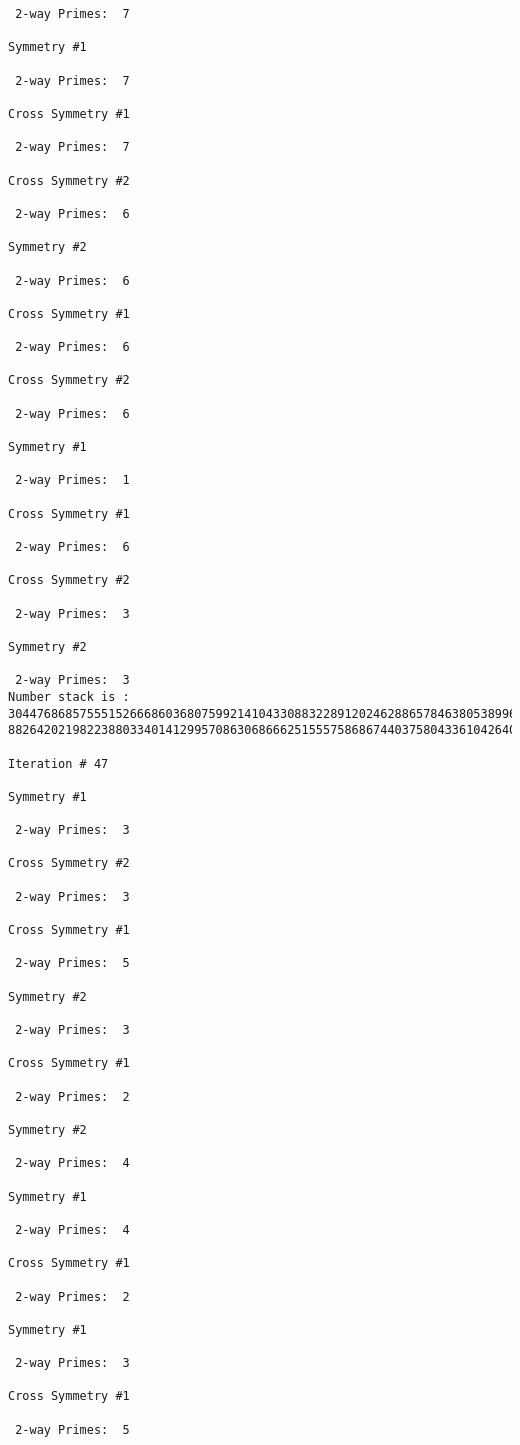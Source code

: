 {{{{\begin{verbatim}
 2-way Primes: 	7

Symmetry #1

 2-way Primes: 	7

Cross Symmetry #1

 2-way Primes: 	7

Cross Symmetry #2

 2-way Primes: 	6

Symmetry #2

 2-way Primes: 	6

Cross Symmetry #1

 2-way Primes: 	6

Cross Symmetry #2

 2-way Primes: 	6

Symmetry #1

 2-way Primes: 	1

Cross Symmetry #1

 2-way Primes: 	6

Cross Symmetry #2

 2-way Primes: 	3

Symmetry #2

 2-way Primes: 	3
Number stack is :
30447686857555152666860368075992141043308832289120246288657846380538996794608835958544046240163340857
88264202198223880334014129957086306866625155575868674403758043361042640445859538806497699835083648756

Iteration #	47

Symmetry #1

 2-way Primes: 	3

Cross Symmetry #2

 2-way Primes: 	3

Cross Symmetry #1

 2-way Primes: 	5

Symmetry #2

 2-way Primes: 	3

Cross Symmetry #1

 2-way Primes: 	2

Symmetry #2

 2-way Primes: 	4

Symmetry #1

 2-way Primes: 	4

Cross Symmetry #1

 2-way Primes: 	2

Symmetry #1

 2-way Primes: 	3

Cross Symmetry #1

 2-way Primes: 	5


\end{verbatim}}}}}
